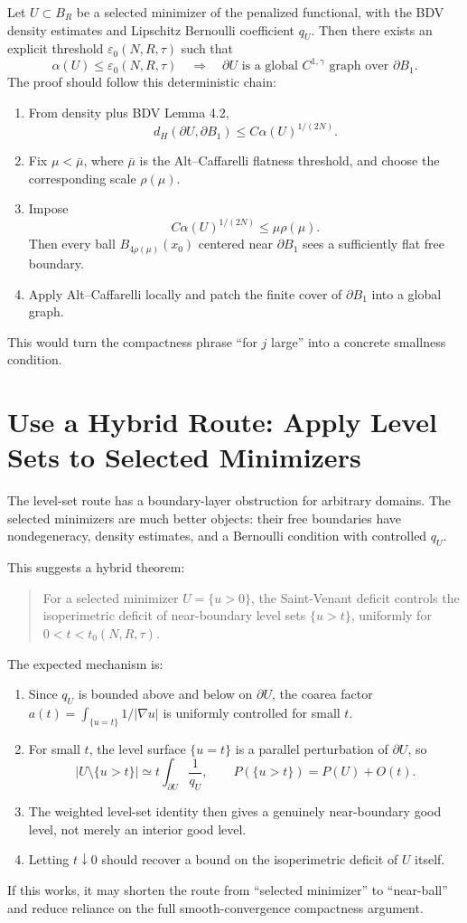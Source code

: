 \documentclass[11pt]{article}
\begin{document}
Let \(U\subset B_R\) be a selected minimizer of the penalized functional, with
the BDV density estimates and Lipschitz Bernoulli coefficient \(q_U\). Then
there exists an explicit threshold \(\varepsilon_0(N,R,\tau)\) such that
\[
\alpha(U)\le \varepsilon_0(N,R,\tau)
\quad\Longrightarrow\quad
\partial U
\text{ is a global }C^{1,\gamma}\text{ graph over }\partial B_1.
\]
The proof should follow this deterministic chain:
\begin{enumerate}
\item From density plus BDV Lemma 4.2,
\[
d_H(\partial U,\partial B_1)\le C\alpha(U)^{1/(2N)}.
\]
\item Fix \(\mu<\bar\mu\), where \(\bar\mu\) is the Alt--Caffarelli flatness
threshold, and choose the corresponding scale \(\rho(\mu)\).
\item Impose
\[
C\alpha(U)^{1/(2N)}\le \mu\rho(\mu).
\]
Then every ball \(B_{4\rho(\mu)}(x_0)\) centered near \(\partial B_1\) sees a
sufficiently flat free boundary.
\item Apply Alt--Caffarelli locally and patch the finite cover of \(\partial B_1\)
into a global graph.
\end{enumerate}
This would turn the compactness phrase ``for \(j\) large'' into a concrete
smallness condition.

\section{Use a Hybrid Route: Apply Level Sets to Selected Minimizers}

The level-set route has a boundary-layer obstruction for arbitrary domains.
The selected minimizers are much better objects: their free boundaries have
nondegeneracy, density estimates, and a Bernoulli condition with controlled
\(q_U\).

This suggests a hybrid theorem:

\begin{quote}
For a selected minimizer \(U=\{u>0\}\), the Saint-Venant deficit controls the
isoperimetric deficit of near-boundary level sets \(\{u>t\}\), uniformly for
\(0<t<t_0(N,R,\tau)\).
\end{quote}

The expected mechanism is:
\begin{enumerate}
\item Since \(q_U\) is bounded above and below on \(\partial U\), the coarea
factor \(a(t)=\int_{\{u=t\}}1/|\nabla u|\) is uniformly controlled for small
\(t\).
\item For small \(t\), the level surface \(\{u=t\}\) is a parallel perturbation
of \(\partial U\), so
\[
|U\setminus\{u>t\}|\simeq t\int_{\partial U}\frac1{q_U},
\qquad
P(\{u>t\})=P(U)+O(t).
\]
\item The weighted level-set identity then gives a genuinely near-boundary good
level, not merely an interior good level.
\item Letting \(t\downarrow0\) should recover a bound on the isoperimetric
deficit of \(U\) itself.
\end{enumerate}
If this works, it may shorten the route from ``selected minimizer'' to
``near-ball'' and reduce reliance on the full smooth-convergence compactness
argument.
\end{document}

